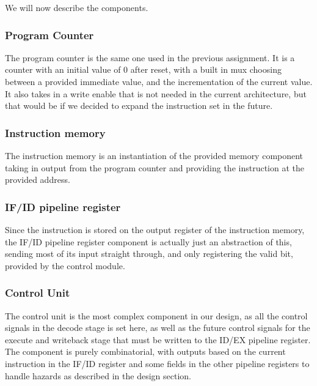 \documentclass[11pt]{report}
\begin{document}
We will now describe the components.
\subsubsection*{Program Counter}
The program counter is the same one used in the previous assignment. 
It is a counter with an initial value of 0 after reset, with a built in
mux choosing between a provided immediate value, and the incrementation of
the current value. It also takes in a write enable that is not needed in
the current architecture, but that would be if we decided to expand the 
instruction set in the future.

\subsubsection*{Instruction memory}
The instruction memory is an instantiation of the provided memory component taking in
output from the program counter and providing the instruction at the provided
address.
\subsubsection*{IF/ID pipeline register}
Since the instruction is stored on the output register of the instruction memory,
the IF/ID pipeline register component is actually just an abstraction of this, sending 
most of its input straight through, and only registering the valid bit, provided by
the control module.

\subsubsection*{Control Unit}

The control unit is the most complex component in our design, as all the control
signals in the decode stage is set here, as well as the future control signals for
the execute and writeback stage that must be written to the ID/EX pipeline register.
The component is purely combinatorial, with outputs based on the current instruction in the
IF/ID register and some fields in the other pipeline registers to handle hazards as
described in the design section. %
\end{document}
